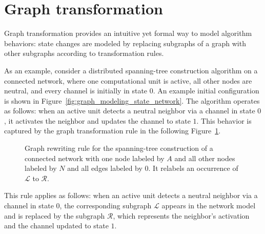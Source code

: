 \section{Graph transformation}
Graph transformation provides an intuitive yet formal way to model algorithm behaviors: state changes are modeled by replacing subgraphs of a graph with other subgraphs according to transformation rules.

As an example, consider a distributed spanning-tree construction algorithm on a connected network, where one computational unit is active, all other nodes are neutral, and every channel is initially in state $0$. An example initial configuration is shown in Figure~\ref{fig:graph_modeling_state_network}. 
The algorithm operates as follows: when an active unit detects a neutral neighbor via a channel in state $0$, it activates the neighbor and updates the channel to state $1$.
 This behavior is captured by the graph transformation rule in the following Figure~\ref{fig:intro:graph_transformation_rule_0}.
 \begin{figure}[H]
        \centering 
        \caption{Graph rewriting rule for the spanning-tree construction of a connected network with one node labeled by $A$ and all other nodes labeled by $N$ and all edges labeled by $0$. It relabels an occurrence of \(\mathcal{L}\) to \(\mathcal{R}\).}
        \label{fig:intro:graph_transformation_rule_0}
    \end{figure}
\noindent This rule applies as follows: when an active unit detects a neutral neighbor via a channel in state $0$, the corresponding subgraph \(\mathcal{L}\) appears in the network model and is replaced by the subgraph \(\mathcal{R}\), which represents the neighbor's activation and the channel updated to state $1$.

